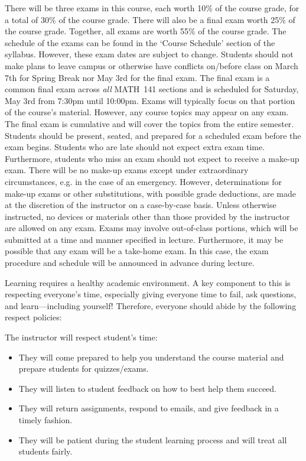 \documentclass[11pt,letterpaper]{article}
\begin{document}

There will be three exams in this course, each worth 10\% of the course grade, for a total of 30\% of the course grade. There will also be a final exam worth 25\% of the course grade. Together, all exams are worth 55\% of the course grade. The schedule of the exams can be found in the `Course Schedule' section of the syllabus. However, these exam dates are subject to change. Students should not make plans to leave campus or otherwise have conflicts on/before class on March 7th for Spring Break nor May 3rd for the final exam. The final exam is a common final exam across \textit{all} MATH~141 sections and is scheduled for Saturday, May 3rd from 7:30pm until 10:00pm. Exams will typically focus on that portion of the course's material. However, any course topics may appear on any exam. The final exam is cumulative and will cover the topics from the entire semester. Students should be present, seated, and prepared for a scheduled exam before the exam begins. Students who are late should not expect extra exam time. Furthermore, students who miss an exam should not expect to receive a make-up exam. There will be no make-up exams except under extraordinary circumstances, e.g. in the case of an emergency. However, determinations for make-up exams or other substitutions, with possible grade deductions, are made at the discretion of the instructor on a case-by-case basis. Unless otherwise instructed, no devices or materials other than those provided by the instructor are allowed on any exam. Exams may involve out-of-class portions, which will be submitted at a time and manner specified in lecture. Furthermore, it may be possible that any exam will be a take-home exam. In this case, the exam procedure and schedule will be announced in advance during lecture. 
\sectionbreak




Learning requires a healthy academic environment. A key component to this is respecting everyone's time, especially giving everyone time to fail, ask questions, and learn---including yourself! Therefore, everyone should abide by the following respect policies: \pspace

The instructor will respect student's time:
	\begin{itemize}
	\item They will come prepared to help you understand the course material and prepare students for quizzes/exams. 
	\item They will listen to student feedback on how to best help them succeed. 
	\item They will return assignments, respond to emails, and give feedback in a timely fashion. 
	\item They will be patient during the student learning process and will treat all students fairly. 
	\end{itemize} \pspace
\end{document}
